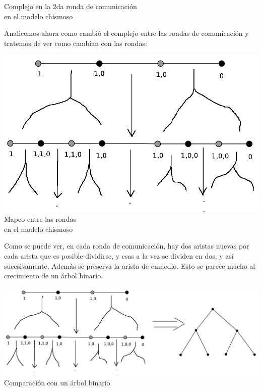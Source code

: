\documentclass{article}
\begin{document}
\begin{enumerate}
{\begin{enumerate}
\begin{center}
        \scriptsize{Complejo en la 2da ronda de comunicación\\en el modelo chismoso}\\
        \end{center}
        Analicemos ahora como cambió el complejo entre las rondas de comunicación y tratemos
        de ver como cambian con las rondas:
        \begin{center}
        \includegraphics[scale=0.2]{cambiosrondas1a.png}\\
        \scriptsize{Mapeo entre las rondas\\en el modelo chismoso}\\
        \end{center}
        Como se puede ver, en cada ronda de comunicación, hay dos aristas nuevas por cada
        arista que es posible dividirse, y esas a la vez se dividen en dos, y así sucesivamente.
        Además se preserva la arista de enmedio. Esto se parece mucho al crecimiento de un árbol
        binario.
        \begin{center}
        \includegraphics[scale=0.2]{cambioschismosoarbol1a.png}\\
        \scriptsize{Comparación con un árbol binario}\\
        \end{center}

\end{enumerate}}
\end{enumerate}
\end{document}

